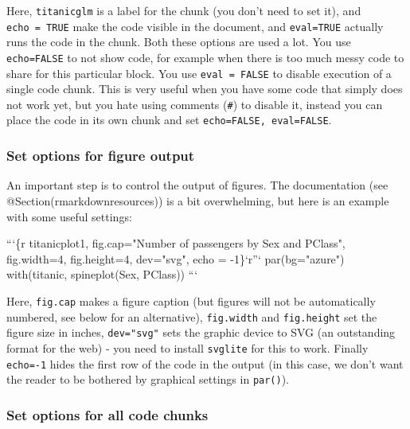 \documentclass[]{book}
\newenvironment{Shaded}{\begin{snugshade}}{\end{snugshade}}
\newcommand{\DataTypeTok}[1]{\textcolor[rgb]{0.13,0.29,0.53}{#1}}
\newcommand{\NormalTok}[1]{#1}
\newcommand{\StringTok}[1]{\textcolor[rgb]{0.31,0.60,0.02}{#1}}
\begin{document}
Here, \texttt{titanicglm} is a label for the chunk (you don't need to set it), and \texttt{echo\ =\ TRUE} make the code visible in the document, and \texttt{eval=TRUE} actually runs the code in the chunk. Both these options are used a lot. You use \texttt{echo=FALSE} to not show code, for example when there is too much messy code to share for this particular block. You use \texttt{eval\ =\ FALSE} to disable execution of a single code chunk. This is very useful when you have some code that simply does not work yet, but you hate using comments (\texttt{\#}) to disable it, instead you can place the code in its own chunk and set \texttt{echo=FALSE,\ eval=FALSE}.

\hypertarget{set-options-for-figure-output}{%
\subsubsection*{Set options for figure output}\label{set-options-for-figure-output}}

An important step is to control the output of figures. The documentation (see @Section(rmarkdownresources)) is a bit overwhelming, but here is an example with some useful settings:

\begin{Shaded}
\begin{Highlighting}[]

\StringTok{```}\DataTypeTok{\{r titanicplot1, fig.cap="Number of passengers by Sex and PClass", fig.width=4, fig.height=4, dev="svg", echo = -1\}}\StringTok{`}\NormalTok{r}\StringTok{''`}
\DataTypeTok{par(bg="azure")}
\DataTypeTok{with(titanic, spineplot(Sex, PClass))}
\StringTok{```}
\end{Highlighting}
\end{Shaded}

Here, \texttt{fig.cap} makes a figure caption (but figures will not be automatically numbered, see below for an alternative), \texttt{fig.width} and \texttt{fig.height} set the figure size in inches, \texttt{dev="svg"} sets the graphic device to SVG (an outstanding format for the web) - you need to install \texttt{svglite} for this to work. Finally \texttt{echo=-1} hides the first row of the code in the output (in this case, we don't want the reader to be bothered by graphical settings in \texttt{par()}).

\hypertarget{set-options-for-all-code-chunks}{%
\subsubsection*{Set options for all code chunks}\label{set-options-for-all-code-chunks}}
\end{document}
